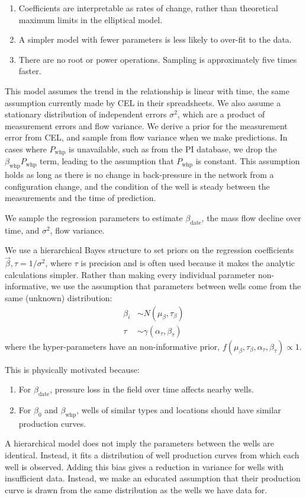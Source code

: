 \documentclass[a4paper, 12pt]{article}
\newlength{\drop}
\begin{document}
\begin{enumerate}
\item Coefficients are interpretable as rates of change, rather than theoretical maximum limits in the elliptical model.
\item A simpler model with fewer parameters is less likely to over-fit to the data.
\item There are no root or power operations. Sampling is approximately five times faster.
\end{enumerate}

This model assumes the trend in the relationship is linear with time, the same assumption currently made by CEL in their spreadsheets. We also assume a stationary distribution of independent errors $\sigma^2$, which are a product of measurement errors and flow variance. We derive a prior for the measurement error from CEL, and sample from flow variance when we make predictions. In cases where $P_\text{whp}$ is unavailable, such as from the PI database, we drop the $\beta_\text{whp}P_\text{whp}$ term, leading to the assumption that $P_\text{whp}$ is constant. This assumption holds as long as there is no change in back-pressure in the network from a configuration change, and the condition of the well is steady between the measurements and the time of prediction.

We sample the regression parameters to estimate $\beta_\text{date}$, the mass flow decline over time, and $\sigma^2$, flow variance.

We use a hierarchical Bayes structure to set priors on the regression coefficients $\vec{\beta},\tau=1/\sigma^2$, where $\tau$ is precision and is often used because it makes the analytic calculations simpler. Rather than making every individual parameter non-informative, we use the assumption that parameters between wells come from the same (unknown) distribution:
\begin{align}
\beta_i &\sim N\left( \mu_\beta,\tau_\beta \right)\\
\tau &\sim \gamma\left(\alpha_\tau,\beta_\tau\right)
\end{align}
where the hyper-parameters have an non-informative prior, $f\left(\mu_\beta,\tau_\beta,\alpha_\tau,\beta_\tau\right) \propto 1$.
 
This is physically motivated because:
\begin{enumerate}
\item For $\beta_\text{date}$, pressure loss in the field over time affects nearby wells.
\item For $\beta_0$ and $\beta_\text{whp}$, wells of similar types and locations should have similar production curves.
\end{enumerate}
A hierarchical model does not imply the parameters between the wells are identical. Instead, it fits a distribution of well production curves from which each well is observed. Adding this bias gives a reduction in variance for wells with insufficient data. Instead, we make an educated assumption that their production curve is drawn from the same distribution as the wells we have data for.
\end{document}
